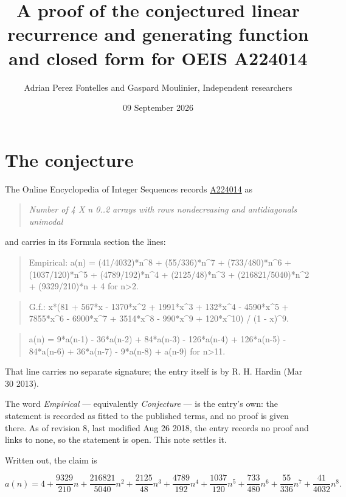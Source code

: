 \documentclass[11pt]{article}
\title{A proof of the conjectured linear recurrence and generating function and closed form for OEIS A224014}
\author{Adrian Perez Fontelles and Gaspard Moulinier, Independent researchers}
\date{09 September 2026}
\theoremstyle{definition}
\begin{document}
\maketitle
\section{The conjecture}

The Online Encyclopedia of Integer Sequences records \href{https://oeis.org/A224014}{A224014} as

\begin{quote}\itshape Number of 4 X n 0..2 arrays with rows nondecreasing and antidiagonals unimodal\end{quote}

and carries in its Formula section the lines:

\begin{quote}\ttfamily Empirical: a(n) = (41/4032)*n\textasciicircum{}8 + (55/336)*n\textasciicircum{}7 + (733/480)*n\textasciicircum{}6 + (1037/120)*n\textasciicircum{}5 + (4789/192)*n\textasciicircum{}4 + (2125/48)*n\textasciicircum{}3 + (216821/5040)*n\textasciicircum{}2 + (9329/210)*n + 4 for n>2.\end{quote}

\begin{quote}\ttfamily G.f.: x*(81 + 567*x - 1370*x\textasciicircum{}2 + 1991*x\textasciicircum{}3 + 132*x\textasciicircum{}4 - 4590*x\textasciicircum{}5 + 7855*x\textasciicircum{}6 - 6900*x\textasciicircum{}7 + 3514*x\textasciicircum{}8 - 990*x\textasciicircum{}9 + 120*x\textasciicircum{}10) / (1 - x)\textasciicircum{}9.\end{quote}

\begin{quote}\ttfamily a(n) = 9*a(n-1) - 36*a(n-2) + 84*a(n-3) - 126*a(n-4) + 126*a(n-5) - 84*a(n-6) + 36*a(n-7) - 9*a(n-8) + a(n-9) for n>11.\end{quote}

That line carries no separate signature; the entry itself is by R. H. Hardin (Mar 30 2013).

The word {\itshape Empirical} --- equivalently {\itshape Conjecture} --- is the entry's own: the statement is recorded as fitted to the published terms, and no proof is given there. As of revision 8, last modified Aug 26 2018, the entry records no proof and links to none, so the statement is open. This note settles it.

Written out, the claim is

\[a(n) = 4 + \frac{9329}{210}n + \frac{216821}{5040}n^{2} + \frac{2125}{48}n^{3} + \frac{4789}{192}n^{4} + \frac{1037}{120}n^{5} + \frac{733}{480}n^{6} + \frac{55}{336}n^{7} + \frac{41}{4032}n^{8}.\]
\end{document}
